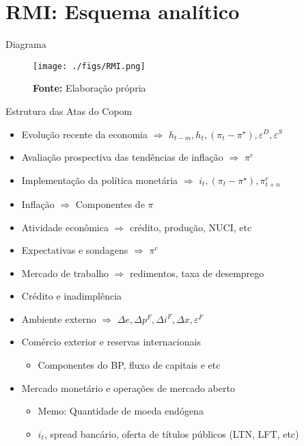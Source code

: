 \documentclass[presentation]{beamer}
\begin{document}
\section{RMI: Esquema analítico}
\label{sec:org1586bab}

\begin{frame}[label={sec:orgb1b1d39}]{Diagrama}
\begin{figure}[htb]
\centering
\caption{Representação do Modelo do regime de Metas para inflação} 
\texttt{[image: ./figs/RMI.png]}
\label{fig:ibcbr}
\caption*{\textbf{Fonte:} Elaboração própria}
\end{figure}
\end{frame}
\begin{frame}[label={sec:orga6f6585}]{Estrutura das Atas do Copom}
\begin{itemize}
\item Evolução recente da economia \(\Rightarrow\) \(h_{t-m}, h_{t}, (\pi_{t} - \pi^{\star}), \varepsilon^{D}, \varepsilon^{S}\)
\item Avaliação prospectiva das tendências de inflação \(\Rightarrow\) \(\pi^{e}\)
\item Implementação da política monetária \(\Rightarrow\) \(i_{t}, (\pi_{t} - \pi^{\star}), \pi^{e}_{t+n}\)
\item Inflação \(\Rightarrow\) Componentes de \(\pi\)
\item Atividade econômica \(\Rightarrow\) crédito, produção, NUCI, etc
\item Expectativas e sondagens \(\Rightarrow\) \(\pi^{e}\)
\item Mercado de trabalho \(\Rightarrow\) redimentos, taxa de desemprego
\item Crédito e inadimplência
\item Ambiente externo \(\Rightarrow\) \(\Delta e, \Delta p^{F}, \Delta i^{F}, \Delta x, \varepsilon^{F}\)
\item Comércio exterior e reservas internacionais
\begin{itemize}
\item Componentes do BP, fluxo de capitais e etc
\end{itemize}
\item Mercado monetário e operações de mercado aberto
\begin{itemize}
\item \alert{Memo:} Quantidade de moeda endógena
\item \(i_{t}\), spread bancário, oferta de títulos públicos (LTN, LFT, etc)
\end{itemize}
\end{itemize}
\end{frame}
\end{document}
